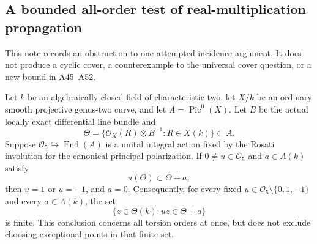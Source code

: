 \subsection{A bounded all-order test of real-multiplication propagation}
\label{sec:kt-rm-theta-propagation-limit}

This note records an obstruction to one attempted incidence argument.
It does not produce a cyclic cover, a counterexample to the universal
cover question, or a new bound in A45--A52.

\begin{proposition}
Let $k$ be an algebraically closed field of characteristic two, let
$X/k$ be an ordinary smooth projective genus-two curve, and let
$A=\operatorname{Pic}^0(X)$.  Let $B$ be the actual locally exact
differential line bundle and
\[
 \Theta=\{\mathcal O_X(R)\otimes B^{-1}:R\in X(k)\}\subset A.
                                                               \tag{RT.1}
\]
Suppose $\mathcal O_5\hookrightarrow\operatorname{End}(A)$ is
a unital integral action fixed by the Rosati involution for the
canonical principal polarization.  If $0\ne u\in\mathcal O_5$
and $a\in A(k)$ satisfy
\[
                         u(\Theta)\subset\Theta+a,
                                                               \tag{RT.2}
\]
then $u=1$ or $u=-1$, and $a=0$.
Consequently, for every fixed $u\in\mathcal O_5\setminus\{0,1,-1\}$
and every $a\in A(k)$, the set
\[
                    \{z\in\Theta(k):u z\in\Theta+a\}
                                                               \tag{RT.3}
\]
is finite.  This conclusion concerns all torsion orders at once,
but does not exclude choosing exceptional points in that finite set.
\end{proposition}

